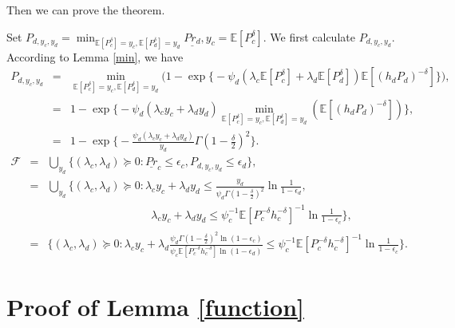 \documentclass[12pt, draftclsnofoot, journal, letterpaper, onecolumn]{IEEEtran}
\begin{document}
Then we can prove the theorem.
\begin{IEEEproof}
Set $P_{d,y_c,y_d}=\min_{\mathbb{E}[P_c^\delta]=y_c,\mathbb{E}[P_d^\delta]=y_d}\underline{Pr_d},y_c=\mathbb{E}[P_c^\delta]$.
We first calculate $P_{d,y_c,y_d}$. According to Lemma \ref{min}, we have
\begin{eqnarray*}
P_{d,y_c,y_d}&=& \min_{\mathbb{E}[P_c^\delta]=y_c,\mathbb{E}[P_d^\delta]=y_d}\bigg(
1-\exp\big\{-\psi_d(\lambda_c\mathbb{E}[P_c^\delta]+\lambda_d\mathbb{E}[P_d^\delta])\mathbb{E}[(h_dP_d)^{-\delta}]\big\}\bigg),\\
&=& 1-\exp\big\{-\psi_d(\lambda_cy_c+\lambda_dy_d)\min_{\mathbb{E}[P_c^\delta]=y_c,\mathbb{E}[P_d^\delta]=y_d}(\mathbb{E}[(h_dP_d)^{-\delta}])\big\},\\
&=&
1-\exp\big\{-\frac{\psi_d(\lambda_cy_c+\lambda_dy_d)}{y_d}\Gamma(1-\frac{\delta}{2})^2\big\}.
\end{eqnarray*}
\begin{eqnarray*}
\mathcal{F}&=&\bigcup_{y_d}\big\{(\lambda_c,\lambda_d)\succeq0:\underline{Pr}_c\leq\epsilon_c,P_{d,y_c,y_d}\leq\epsilon_d\big\},\\
&=&\bigcup_{y_d}\big\{(\lambda_c,\lambda_d)\succeq0:\lambda_cy_c+\lambda_dy_d\leq\frac{y_d}{\psi_d\Gamma(1-\frac{\delta}{2})^2}\ln\frac{1}{1-\epsilon_d},\\
&&\phantom{\bigcup_{y_d}\big\{(\lambda_c,\lambda_d)\succeq0:a} \lambda_cy_c+\lambda_dy_d\leq\psi_c^{-1}\mathbb{E}[P_c^{-\delta}h_c^{-\delta}]^{-1}\ln\frac{1}{1-\epsilon_c}\big\},\\
&=&\big\{(\lambda_c,\lambda_d)\succeq0:\lambda_cy_c+\lambda_d\frac{\psi_d\Gamma(1-\frac{\delta}{2})^2\ln(1-\epsilon_c)}{\psi_c\mathbb{E}[P_c^{-\delta}h_c^{-\delta}]\ln(1-\epsilon_d)}\leq\psi_c^{-1}\mathbb{E}[P_c^{-\delta}h_c^{-\delta}]^{-1}\ln\frac{1}{1-\epsilon_c}\big\}.
\end{eqnarray*}
\end{IEEEproof}


\section{Proof of Lemma \ref{function}}\label{functionproof}
\end{document}
